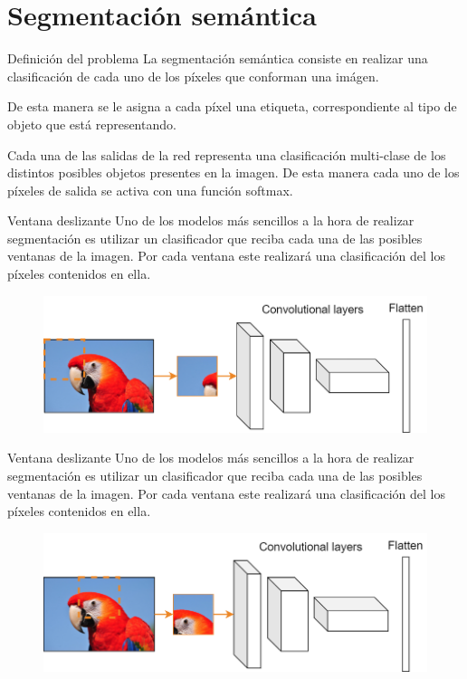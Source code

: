 \section{Segmentación semántica}

\begin{frame}{Definición del problema}
La \alert{segmentación semántica} consiste en realizar una \alert{clasificación} de cada uno de los \alert{píxeles} que conforman una imágen.

De esta manera se le asigna a cada píxel una \alert{etiqueta}, correspondiente al tipo de objeto que está \alert{representando}.

Cada una de las \alert{salidas de la red} representa una \alert{clasificación multi-clase} de los distintos posibles objetos presentes en la imagen. De esta manera cada uno de los \alert{píxeles de salida} se activa con una función \alert{softmax}.
\end{frame}

\begin{frame}{Ventana deslizante}
Uno de los modelos más \alert{sencillos} a la hora de realizar segmentación es utilizar un \alert{clasificador} que reciba cada una de las posibles ventanas de la imagen. Por cada ventana este realizará una \alert{clasificación} del los píxeles contenidos en ella.

\begin{figure}
    \centering
    \includegraphics[width=\textwidth]{Slides/figures/Tema 4/SlidingWindow.png}
\end{figure}
\end{frame}

\begin{frame}{Ventana deslizante}
Uno de los modelos más \alert{sencillos} a la hora de realizar segmentación es utilizar un \alert{clasificador} que reciba cada una de las posibles ventanas de la imagen. Por cada ventana este realizará una \alert{clasificación} del los píxeles contenidos en ella.

\begin{figure}
    \centering
    \includegraphics[width=\textwidth]{Slides/figures/Tema 4/SlidingWindow_1.png}
\end{figure}
\end{frame}

